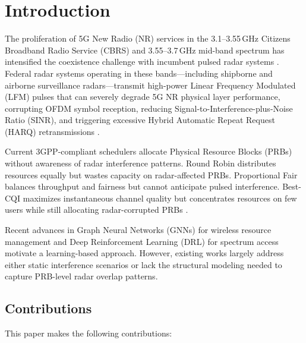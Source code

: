 \documentclass[conference]{IEEEtran}
\begin{document}
\section{Introduction}

The proliferation of 5G New Radio (NR) services in the 3.1--3.55\,GHz Citizens Broadband Radio Service (CBRS) and 3.55--3.7\,GHz mid-band spectrum has intensified the coexistence challenge with incumbent pulsed radar systems \cite{labib2017coexistence, zheng2019spectrum}. Federal radar systems operating in these bands---including shipborne and airborne surveillance radars---transmit high-power Linear Frequency Modulated (LFM) pulses that can severely degrade 5G NR physical layer performance, corrupting OFDM symbol reception, reducing Signal-to-Interference-plus-Noise Ratio (SINR), and triggering excessive Hybrid Automatic Repeat Request (HARQ) retransmissions \cite{sharma2020radar5g}.

Current 3GPP-compliant schedulers allocate Physical Resource Blocks (PRBs) without awareness of radar interference patterns. Round Robin distributes resources equally but wastes capacity on radar-affected PRBs. Proportional Fair balances throughput and fairness but cannot anticipate pulsed interference. Best-CQI maximizes instantaneous channel quality but concentrates resources on few users while still allocating radar-corrupted PRBs \cite{3gpp_ts38214}.

Recent advances in Graph Neural Networks (GNNs) for wireless resource management \cite{shen2021graph_resource, he2021gnn_wireless} and Deep Reinforcement Learning (DRL) for spectrum access \cite{lee2020drl_resource, nasir2021gnn_resource} motivate a learning-based approach. However, existing works largely address either static interference scenarios or lack the structural modeling needed to capture PRB-level radar overlap patterns.

\subsection{Contributions}

This paper makes the following contributions:
\end{document}
